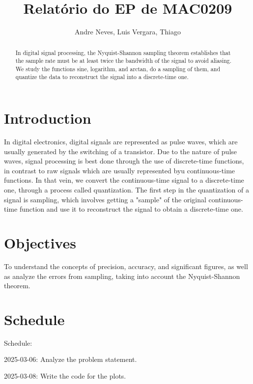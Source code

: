 \documentclass{article}
\title{Relatório do EP de MAC0209}
\author{Andre Neves, Luis Vergara, Thiago}
\begin{document}
\maketitle


\begin{abstract}
In digital signal processing, the Nyquist-Shannon sampling theorem establishes that the sample rate must be at least twice the bandwidth of the signal to avoid aliasing. 
We study the functions sine, logarithm, and arctan, do a sampling of them, and quantize the data to reconstruct the signal into a discrete-time one. 

\end{abstract}

\newpage

\tableofcontents

\newpage

\section{Introduction}

In digital electronics, digital signals are represented as pulse waves, which are usually generated by the switching of a transistor. 
Due to the nature of pulse waves, signal processing is best done through the use of discrete-time functions, in contrast to raw signals which are usually represented byu continuous-time functions. 
In that vein, we convert the continuous-time signal to a discrete-time one, through a process called quantization. 
The first step in the quantization of a signal is sampling, which involves getting a "sample" of the original continuous-time function and use it to reconstruct the signal to obtain a discrete-time one. 

\section{Objectives}

To understand the concepts of precision, accuracy, and significant figures, as well as analyze the errors from sampling, taking into account the Nyquist-Shannon theorem. 

\section{Schedule}

Schedule:  

2025-03-06: Analyze the problem statement.  

2025-03-08: Write the code for the plots.  
\end{document}
